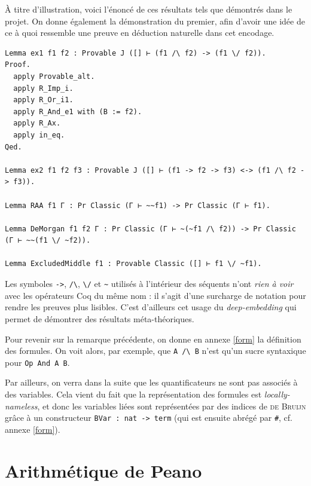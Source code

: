 \documentclass[a4paper]{article}
\theoremstyle{remark}
\theoremstyle{remark}
\theoremstyle{remark}
\theoremstyle{definition}
\theoremstyle{definition}
\theoremstyle{definition}
\begin{document}
\`A titre d'illustration, voici l'énoncé de ces résultats tels que démontrés dans le projet. On donne également la démonstration du premier, afin d'avoir une idée de ce à quoi ressemble une preuve en déduction naturelle dans cet encodage.

\begin{verbatim}
Lemma ex1 f1 f2 : Provable J ([] ⊢ (f1 /\ f2) -> (f1 \/ f2)).
Proof.
  apply Provable_alt.
  apply R_Imp_i.
  apply R_Or_i1.
  apply R_And_e1 with (B := f2).
  apply R_Ax.
  apply in_eq.
Qed.

Lemma ex2 f1 f2 f3 : Provable J ([] ⊢ (f1 -> f2 -> f3) <-> (f1 /\ f2 -> f3)).

Lemma RAA f1 Γ : Pr Classic (Γ ⊢ ~~f1) -> Pr Classic (Γ ⊢ f1).

Lemma DeMorgan f1 f2 Γ : Pr Classic (Γ ⊢ ~(~f1 /\ f2)) -> Pr Classic (Γ ⊢ ~~(f1 \/ ~f2)).

Lemma ExcludedMiddle f1 : Provable Classic ([] ⊢ f1 \/ ~f1).
\end{verbatim}

\noindent \begin{minipage}[t]{0.05\linewidth}
\dbend
\end{minipage} \begin{minipage}[c]{0.95\linewidth}
Les symboles \verb+->+, \verb+/\+, \verb+\/+ et \verb+~+ utilisés à l'intérieur des séquents n'ont \emph{rien à voir} avec les opérateurs Coq du même nom : il s'agit d'une surcharge de notation pour rendre les preuves plus lisibles. C'est d'ailleurs cet usage du \emph{deep-embedding} qui permet de démontrer des résultats méta-théoriques.
\end{minipage}
\smallskip

Pour revenir sur la remarque précédente, on donne en annexe \ref{form} la définition des formules. On voit alors, par exemple, que \verb+A /\ B+ n'est qu'un sucre syntaxique pour \verb+Op And A B+.

Par ailleurs, on verra dans la suite que les quantificateurs ne sont pas associés à des variables. Cela vient du fait que la représentation des formules est \emph{locally-nameless}, et donc les variables liées sont représentées par des indices de \textsc{de Bruijn} grâce à un constructeur \verb+BVar : nat -> term+ (qui est ensuite abrégé par \verb+#+, cf. annexe \ref{form}).

\newpage


\section{Arithmétique de {\sc Peano}}
\end{document}
